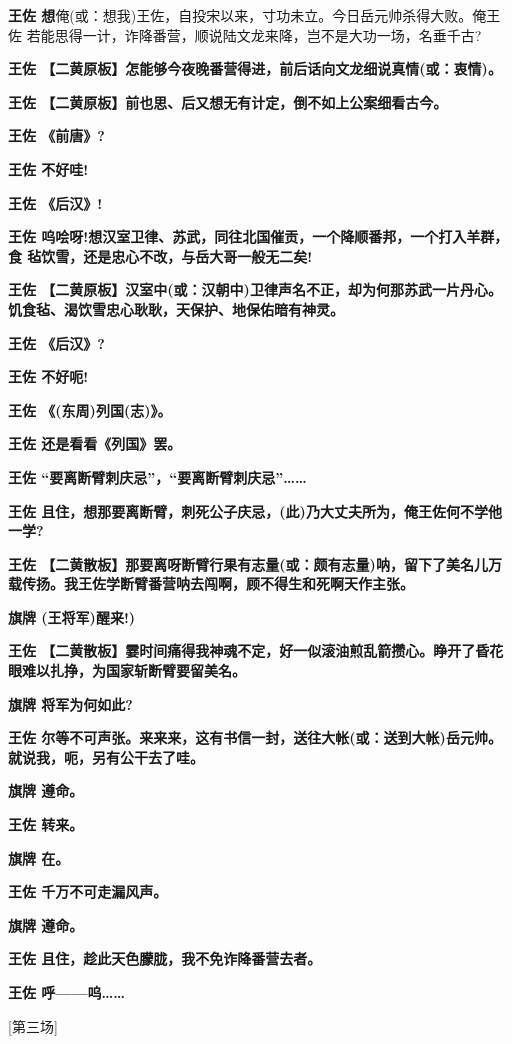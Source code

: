 \textbf{王佐
想}俺(或：想我)王佐，自投宋以来，寸功未立。今日岳元帅杀得大败。俺王佐
若能思得一计，诈降番营，顺说陆文龙来降，岂不是大功一场，名垂千古?

\textbf{王佐
【二黄原板】怎能够今夜晚番营得进，前后话向文龙细说真情(或：衷情)。}

\textbf{王佐 【二黄原板】前也思、后又想无有计定，倒不如上公案细看古今。}

\textbf{王佐 《前唐》?}

\textbf{王佐 不好哇!}

\textbf{王佐 《后汉》!}

\textbf{王佐
呜哙呀!想汉室卫律、苏武，同往北国催贡，一个降顺番邦，一个打入羊群，食
毡饮雪，还是忠心不改，与岳大哥一般无二矣!}

\textbf{王佐
【二黄原板】汉室中(或：汉朝中)卫律声名不正，却为何那苏武一片丹心。饥食毡、渴饮雪忠心耿耿，天保护、地保佑暗有神灵。}

\textbf{王佐 《后汉》?}

\textbf{王佐 不好呃!}

\textbf{王佐 《(东周)列国(志)》。}

\textbf{王佐 还是看看《列国》罢。}

\textbf{王佐 ``要离断臂刺庆忌''，``要离断臂刺庆忌''\ldots{}\ldots{}}

\textbf{王佐
且住，想那要离断臂，刺死公子庆忌，(此)乃大丈夫所为，俺王佐何不学他一学?}

\textbf{王佐
【二黄散板】那要离呀断臂行果有志量(或：颇有志量)呐，留下了美名儿万载传扬。我王佐学断臂番营呐去闯啊，顾不得生和死啊天作主张。}

\textbf{旗牌 (王将军)醒来!)}

\textbf{王佐
【二黄散板】霎时间痛得我神魂不定，好一似滚油煎乱箭攒心。睁开了昏花眼难以扎挣，为国家斩断臂要留美名。}

\textbf{旗牌 将军为何如此?}

\textbf{王佐
尔等不可声张。来来来，这有书信一封，送往大帐(或：送到大帐)岳元帅。就说我，呃，另有公干去了哇。}

\textbf{旗牌 遵命。}

\textbf{王佐 转来。}

\textbf{旗牌 在。}

\textbf{王佐 千万不可走漏风声。}

\textbf{旗牌 遵命。}

\textbf{王佐 且住，趁此天色朦胧，我不免诈降番营去者。}

\textbf{王佐 呼------呜\ldots{}\ldots{}}

{[}第三场{]}

